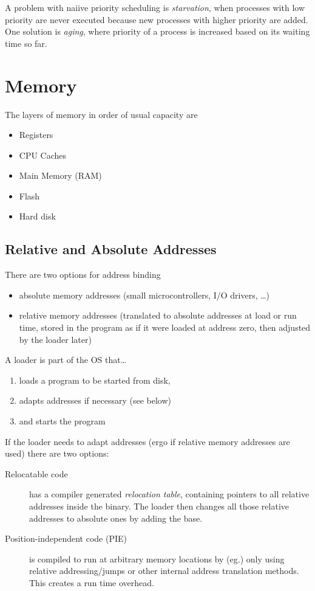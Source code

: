 \documentclass{article}
\begin{document}
\begin{multicols}{1}
A problem with naiive priority scheduling is \emph{starvation}, when processes with low priority are never executed because new processes with higher priority are added. One solution is \emph{aging}, where priority of a process is increased based on its waiting time so far.

\section*{Memory}

The layers of memory in order of usual capacity are
\begin{itemize}
    \item Registers
    \item CPU Caches
    \item Main Memory (RAM)
    \item Flash
    \item Hard disk 
\end{itemize}

\subsection*{Relative and Absolute Addresses}

There are two options for address binding
\begin{itemize}
    \item absolute memory addresses (small microcontrollers, I/O drivers, \ldots)
    \item relative memory addresses (translated to absolute addresses at load or run time, stored in the program as if it were loaded at address zero, then adjusted by the loader later)
\end{itemize}

A loader is part of the OS that\ldots
\begin{enumerate}
    \item loads a program to be started from disk,
    \item adapts addresses if necessary (see below)
    \item and starts the program
\end{enumerate}

If the loader needs to adapt addresses (ergo if relative memory addresses are used) there are two options:

\begin{description}
    \item[Relocatable code] has a compiler generated \emph{relocation table}, containing pointers to all relative addresses inside the binary. The loader then changes all those relative addresses to absolute ones by adding the base.
    \item[Position-independent code (PIE)] is compiled to run at arbitrary memory locations by (eg.) only using relative addressing/jumps or other internal address translation methods. This creates a run time overhead.
\end{description}


\end{multicols}
\end{document}
